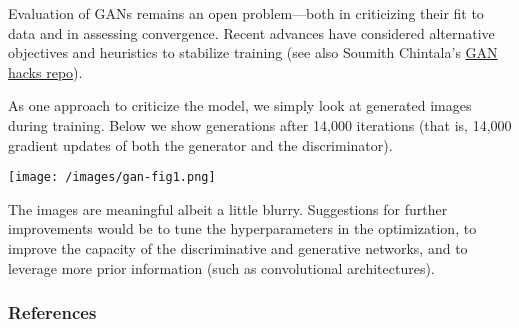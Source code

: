 Evaluation of GANs remains an open problem---both in criticizing their
fit to data and in assessing convergence.
Recent advances have considered alternative objectives and
heuristics to stabilize training (see also Soumith Chintala's
\href{https://github.com/soumith/ganhacks}{GAN hacks repo}).

As one approach to criticize the model, we simply look at generated
images during training. Below we show generations after 14,000
iterations (that is, 14,000 gradient updates of both the generator and
the discriminator).

\texttt{[image: /images/gan-fig1.png]}

The images are meaningful albeit a little blurry. Suggestions for
further improvements would be to tune the hyperparameters in the
optimization, to improve the capacity of the discriminative and
generative networks, and to leverage more prior information (such as
convolutional architectures).

\subsubsection{References}\label{references}
